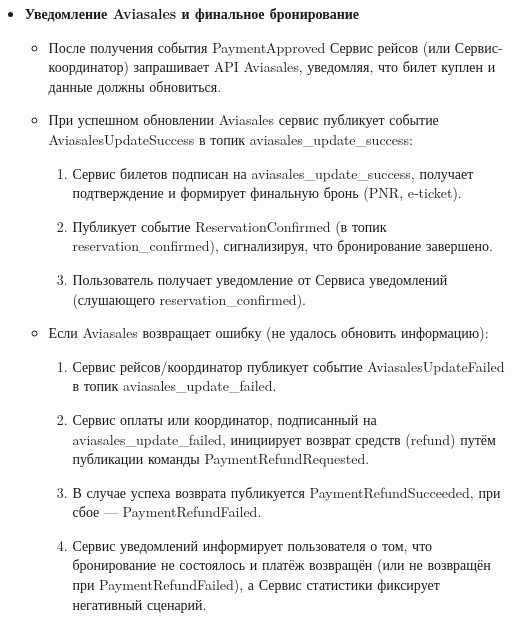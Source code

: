 \begin{enumerate}
\begin{itemize}
        \item \textbf{Уведомление Aviasales и финальное бронирование}
        \begin{itemize}
            \item После получения события PaymentApproved Сервис рейсов (или Сервис-координатор) запрашивает API Aviasales, уведомляя, что билет куплен и данные должны обновиться.
            \item При успешном обновлении Aviasales сервис публикует событие AviasalesUpdateSuccess в топик aviasales\_update\_success:
            \begin{enumerate}
                \item Сервис билетов подписан на aviasales\_update\_success, получает подтверждение и формирует финальную бронь (PNR, e‑ticket).
                \item Публикует событие ReservationConfirmed (в топик reservation\_confirmed), сигнализируя, что бронирование завершено.
                \item Пользователь получает уведомление от Сервиса уведомлений (слушающего reservation\_confirmed).
            \end{enumerate}
            \item Если Aviasales возвращает ошибку (не удалось обновить информацию):
            \begin{enumerate}
                \item Сервис рейсов/координатор публикует событие AviasalesUpdateFailed в топик aviasales\_update\_failed.
                \item Сервис оплаты или координатор, подписанный на aviasales\_update\_failed, инициирует возврат средств (refund) путём публикации команды PaymentRefundRequested.
                \item В случае успеха возврата публикуется PaymentRefundSucceeded, при сбое — PaymentRefundFailed.
                \item Сервис уведомлений информирует пользователя о том, что бронирование не состоялось и платёж возвращён (или не возвращён при PaymentRefundFailed), а Сервис статистики фиксирует негативный сценарий.
            \end{enumerate}
        \end{itemize}


\end{itemize}
\end{enumerate}
